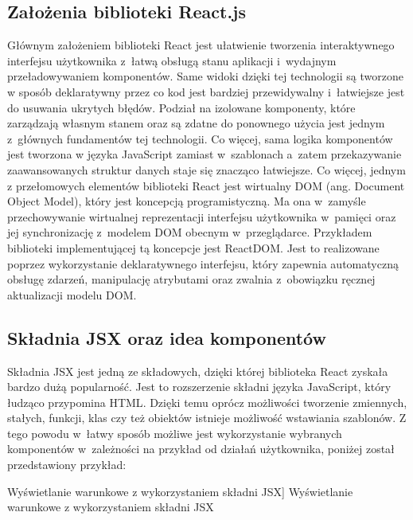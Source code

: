 \documentclass[../Kamil_Kowalewski_Main.tex]{subfiles}
\begin{document}
{{        \subsection{Założenia biblioteki React.js}
        \label{chapter3:technologie:react:zalozenia} {
            Głównym założeniem biblioteki React jest ułatwienie tworzenia interaktywnego
            interfejsu użytkownika z~łatwą obsługą stanu aplikacji i~wydajnym
            przeładowywaniem komponentów. Same widoki dzięki tej technologii są
            tworzone w sposób deklaratywny przez co kod jest bardziej przewidywalny
            i~łatwiejsze jest do usuwania ukrytych błędów. Podział na izolowane
            komponenty, które zarządzają własnym stanem oraz są zdatne do
            ponownego użycia jest jednym z~głównych fundamentów tej technologii. Co
            więcej, sama logika komponentów jest tworzona w języka JavaScript zamiast
            w~szablonach a~zatem przekazywanie zaawansowanych struktur danych staje
            się znacząco łatwiejsze. Co więcej, jednym z przełomowych elementów
            biblioteki React jest wirtualny DOM\cite{website:dom}
            (ang. Document Object Model), który jest koncepcją programistyczną. Ma ona
            w~zamyśle przechowywanie wirtualnej reprezentacji interfejsu użytkownika
            w~pamięci oraz jej synchronizację z~modelem DOM obecnym w~przeglądarce.
            Przykładem biblioteki implementującej tą koncepcje jest
            ReactDOM\cite{website:reactdom}. Jest to realizowane poprzez wykorzystanie
            deklaratywnego interfejsu, który zapewnia automatyczną obsługę zdarzeń,
            manipulację atrybutami oraz zwalnia z~obowiązku ręcznej aktualizacji modelu
            DOM.
        }

        \subsection{Składnia JSX oraz idea komponentów}
        \label{chapter3:technologie:react:jsx} {
            Składnia JSX jest jedną ze składowych, dzięki której biblioteka React
            zyskała bardzo dużą popularność. Jest to rozszerzenie składni języka
            JavaScript, który łudząco przypomina HTML\cite{website:html}. Dzięki temu
            oprócz możliwości tworzenie zmiennych, stałych, funkcji, klas czy też obiektów
            istnieje możliwość wstawiania szablonów. Z tego powodu w~łatwy sposób możliwe jest
            wykorzystanie wybranych komponentów w~zależności na przykład od działań
            użytkownika, poniżej został przedstawiony przykład:
            \begin{code}[H]
                
                \caption
                [Wyświetlanie warunkowe z wykorzystaniem składni JSX]
                {Wyświetlanie warunkowe z wykorzystaniem składni JSX}
                \label{chapter3:technologie:react:jsx:conditional_render}
            \end{code}

}}}
\end{document}
